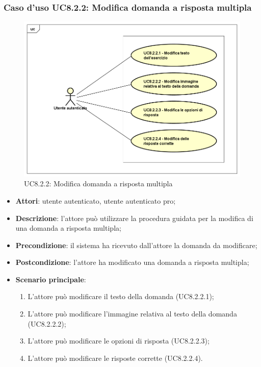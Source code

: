 \subsubsection{Caso d'uso UC8.2.2: Modifica domanda a risposta multipla}
	\label{UC8.2.2}
	\begin{figure}[h]
		\centering
			\includegraphics[scale=0.45,keepaspectratio]{UML/UC8_2_2.png}
		\caption{UC8.2.2: Modifica domanda a risposta multipla}
	\end{figure}
	\FloatBarrier
	\begin{itemize}
		\item
			\textbf{Attori}: utente autenticato, utente autenticato pro;
		\item		
			\textbf{Descrizione}: l'attore può utilizzare la procedura guidata per la modifica di una domanda a risposta multipla;
		\item
			\textbf{Precondizione}: il sistema ha ricevuto dall'attore la domanda da modificare;
		\item
			\textbf{Postcondizione}: l'attore ha modificato una domanda a risposta multipla;
		\item
			\textbf{Scenario principale}:
	       		\begin{enumerate}
	       			\item
	       			L'attore può modificare il testo della domanda (UC8.2.2.1);
	       			\item
	       			L'attore può modificare l'immagine relativa al testo della domanda (UC8.2.2.2);
	       			\item
	       			L'attore può modificare le opzioni di risposta (UC8.2.2.3);
					\item
					L'attore può modificare le risposte corrette (UC8.2.2.4).
	 			\end{enumerate}
	\end{itemize}

